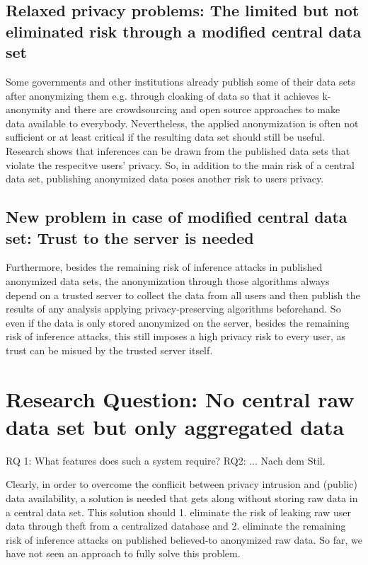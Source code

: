 \subsection{Relaxed privacy problems: The limited but not eliminated risk through a modified central data set}

Some governments and other institutions already publish some of their data sets after anonymizing them e.g. through cloaking of data so that it achieves k-anonymity and there are crowdsourcing and open source approaches to make
data available to everybody. 
Nevertheless, the applied anonymization is often not sufficient or at least critical if the resulting data set should still be useful. Research shows that inferences can be drawn from the published data sets that violate the respecitve users' privacy. So, in addition to the main risk of a central data set, publishing anonymized data poses another risk to users privacy.

\subsection{New problem in case of modified central data set: Trust to the server is needed}

Furthermore, besides the remaining risk of inference attacks in published anonymized data sets, the anonymization through those algorithms always depend on a trusted server to collect the data from all users and then publish the results of any analysis applying privacy-preserving algorithms beforehand. So even if the data is only stored anonymized on the server, besides the remaining risk of inference attacks, this still imposes a high privacy risk to every user, as trust can be misued by the trusted server itself.

\section{Research Question: No central raw data set but only aggregated data}
RQ 1: What features does such a system require?
RQ2: ...
Nach dem Stil.


Clearly, in order to overcome the conflicit between privacy intrusion and (public) data availability, a solution is needed that gets along without storing raw data in a central data set.
This solution should 1. eliminate the risk of leaking raw user data through theft from a centralized database and 2. eliminate the remaining risk of inference attacks on published believed-to anonymized raw data. So far, we have not seen an approach to fully solve this problem.

